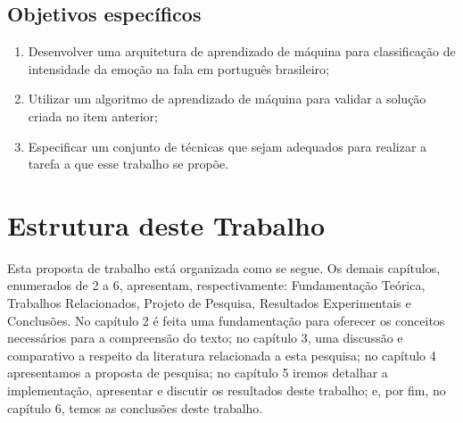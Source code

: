 \subsection{Objetivos específicos}


\begin{enumerate}
    \item Desenvolver uma arquitetura de aprendizado de máquina para classificação de intensidade da emoção na fala em português brasileiro;
    \item Utilizar um algoritmo de aprendizado de máquina para validar a solução criada no item anterior;
    \item Especificar um conjunto de técnicas que sejam adequados para realizar a tarefa a que esse trabalho se propõe.
\end{enumerate}

\section{Estrutura deste Trabalho}

Esta proposta de trabalho está organizada como se segue. Os demais capítulos, enumerados de 2 a 6, apresentam, respectivamente: Fundamentação Teórica, Trabalhos Relacionados, Projeto de Pesquisa, Resultados Experimentais e Conclusões. No capítulo 2 é feita uma fundamentação para oferecer os conceitos necessários para a compreensão do texto; no capítulo 3, uma discussão e comparativo a respeito da literatura relacionada a esta pesquisa; no capítulo 4 apresentamos a proposta de pesquisa; no capítulo 5 iremos detalhar a implementação, apresentar e discutir os resultados deste trabalho; e, por fim, no capítulo 6, temos as conclusões deste trabalho.
